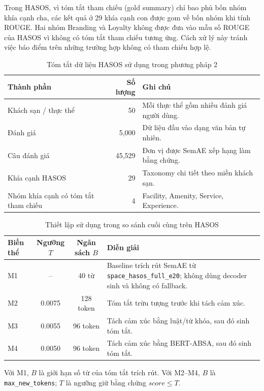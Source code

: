 \documentclass[12pt,a4paper]{report}
\begin{document}
Trong HASOS, vì tóm tắt tham chiếu (gold summary) chỉ bao phủ bốn nhóm khía cạnh cha, các kết quả ở 29 khía cạnh con được gom về bốn nhóm khi tính ROUGE. Hai nhóm Branding và Loyalty không được đưa vào mẫu số ROUGE của HASOS vì không có tóm tắt tham chiếu tương ứng. Cách xử lý này tránh việc báo điểm trên những trường hợp không có tham chiếu hợp lệ.

\begin{table}[tbp]
\centering
\caption{Tóm tắt dữ liệu HASOS sử dụng trong phương pháp 2}
\label{tab:hasos-data-summary}
\begin{tabularx}{\textwidth}{L{0.28\textwidth} r Y}
\toprule
\textbf{Thành phần} & \textbf{Số lượng} & \textbf{Ghi chú} \\
\midrule
Khách sạn / thực thể & 50 & Mỗi thực thể gồm nhiều đánh giá người dùng. \\
Đánh giá & 5,000 & Dữ liệu đầu vào dạng văn bản tự nhiên. \\
Câu đánh giá & 45,529 & Đơn vị được SemAE xếp hạng làm bằng chứng. \\
Khía cạnh HASOS & 29 & Taxonomy chi tiết theo miền khách sạn. \\
Nhóm khía cạnh có tóm tắt tham chiếu & 4 & Facility, Amenity, Service, Experience. \\
\bottomrule
\end{tabularx}
\end{table}

\begin{table}[tbp]
\centering
\caption{Thiết lập sử dụng trong so sánh cuối cùng trên HASOS}
\label{tab:optimal-settings}
\begin{threeparttable}
\begin{tabularx}{\textwidth}{l c c Y}
\toprule
\textbf{Biến thể} & \textbf{Ngưỡng $T$} & \textbf{Ngân sách $B$} & \textbf{Diễn giải} \\
\midrule
M1 & -- & 40 từ & Baseline trích rút SemAE từ \texttt{space\_hasos\_full\_e20}; không dùng decoder sinh và không có fallback. \\
M2 & 0.0075 & 128 token & Tóm tắt trừu tượng trước khi tách cảm xúc. \\
M3 & 0.0055 & 96 token & Tách cảm xúc bằng luật/từ khóa, sau đó sinh tóm tắt. \\
M4 & 0.0050 & 96 token & Tách cảm xúc bằng BERT-ABSA, sau đó sinh tóm tắt. \\
\bottomrule
\end{tabularx}
\begin{tablenotes}
\footnotesize
\item Với M1, $B$ là giới hạn số từ của tóm tắt trích rút. Với M2--M4, $B$ là \texttt{max\_new\_tokens}; $T$ là ngưỡng giữ bằng chứng $score \leq T$.
\end{tablenotes}
\end{threeparttable}
\end{table}
\end{document}
